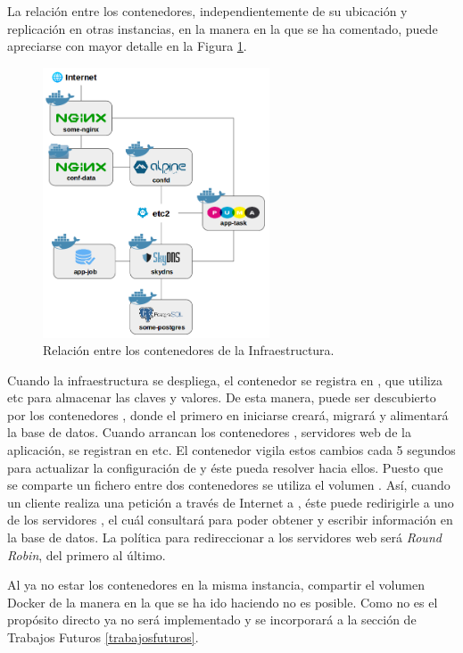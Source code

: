 La relación entre los contenedores, independientemente de su ubicación y replicación en otras instancias, en la manera en la que se ha comentado, puede apreciarse con mayor detalle en la Figura \ref{fig:aws-2-iteration}.

\begin{figure}[H]
\centering
\includegraphics[width=0.6\textwidth]{images/figures/aws-2-iteration.png}
\caption{Relación entre los contenedores de la Infraestructura. \label{fig:aws-2-iteration}}
\end{figure}

Cuando la infraestructura se despliega, el contenedor  se registra en , que utiliza etc para almacenar las claves y valores. De esta manera,  puede ser descubierto por los contenedores , donde el primero en iniciarse creará, migrará y alimentará la base de datos. Cuando arrancan los contenedores , servidores web de la aplicación, se registran en etc. El contenedor  vigila estos cambios cada 5 segundos para actualizar la configuración de  y éste pueda resolver hacia ellos. Puesto que se comparte un fichero entre dos contenedores se utiliza el volumen . Así, cuando un cliente realiza una petición a través de Internet a , éste puede redirigirle a uno de los servidores , el cuál consultará  para poder obtener y escribir información en la base de datos. La política para redireccionar a los servidores web será \textit{Round Robin}, del primero al último.

Al ya no estar los contenedores en la misma instancia, compartir el volumen Docker  de la manera en la que se ha ido haciendo no es posible. Como no es el propósito directo ya no será implementado y se incorporará a la sección de Trabajos Futuros \ref{trabajosfuturos}.


